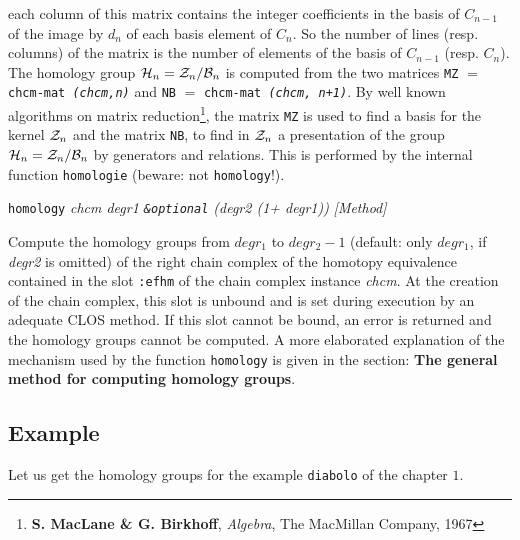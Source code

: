 {{each column  of this matrix contains the integer coefficients in the basis of $C_{n-1}$ of
the image by $d_n$ of each basis element of $C_n$. So the number of lines (resp. columns) of the matrix is
the number of elements of the basis of $C_{n-1}$ (resp. $C_n$).
The homology group
${\cal H}_n={\cal Z}_n/{\cal B}_n$ is computed from the two matrices
{\tt MZ} $=$ {\tt chcm-mat {\em (chcm,n)}} and
{\tt NB} $=$ {\tt chcm-mat {\em (chcm, n+1)}}. By well known algorithms
on matrix reduction\footnote{{\bf S. MacLane \& G. Birkhoff}, {\em Algebra},
The MacMillan Company, 1967}, the matrix {\tt MZ}  is used
to find a basis for the kernel ${\cal Z}_n$ and the matrix {\tt NB}, to find in ${\cal Z}_n$ a presentation
of the group ${\cal H}_n={\cal Z}_n/{\cal B}_n$ by generators and relations. This is performed
by the internal function {\tt homologie} (beware: not {\tt homology}!).\par}
{\leftskip=5mm
{\tt homology} {\em chcm  degr1 {\tt \&optional} (degr2 (1+ degr1))} \hfill {\em [Method]} \par}
{\leftskip=15mm
Compute the homology groups from $degr_1$ to $degr_2-1$ (default: only $degr_1$, if {\em degr2} is omitted) of
the right chain complex of the homotopy equivalence contained in the slot {\tt :efhm} of the
chain complex instance {\em chcm}. At the creation of the chain complex, this slot is unbound and
is set during execution by an adequate CLOS method. If this slot cannot be  bound, an error is returned and
the homology groups cannot be computed. A more elaborated explanation of the mechanism used by the function
{\tt homology} is given in the  section: {\bf The general method for computing homology groups}. \par}
}

\subsection* {Example}

Let us get the homology groups for the example {\tt diabolo} of the chapter $1$.

